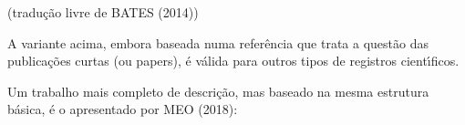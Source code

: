 \documentclass[
12pt,		%
openright,	%
twoside,  %
a4paper,			%
chapter=TITLE,		%
english,			%
french,				%
spanish,			%
brazil				%
]{USPSC-classe/USPSC_RedarTex}
\begin{document}
\begin{flushright}
\setlength{\absparsep}{0pt}
\tiny \begin{flushright}
\setlength{\absparsep}{0pt}
\tiny \begin{flushright}
\setlength{\absparsep}{0pt}
\tiny \begin{flushright}
\setlength{\absparsep}{0pt}
\tiny \begin{flushright}
\setlength{\absparsep}{0pt}
\tiny \begin{flushright}
\setlength{\absparsep}{0pt}
\tiny \begin{flushright}
\setlength{\absparsep}{0pt}
\tiny \begin{flushright}
\setlength{\absparsep}{0pt}
\tiny (tradu\c{c}\~ao livre de BATES (2014)) \normalsize 
\end{flushright}

 \normalsize 
\end{flushright}

 \normalsize 
\end{flushright}

 \normalsize 
\end{flushright}

 \normalsize 
\end{flushright}

 \normalsize 
\end{flushright}

 \normalsize 
\end{flushright}

 \normalsize 
\end{flushright}


A variante acima, embora baseada numa refer\^encia que trata a quest\~ao das publica\c{c}\~oes curtas (ou \textquotedbl papers\textquotedbl ), \'e v\'alida para outros tipos de registros cient\'{\i}ficos.








Um trabalho mais completo de descri\c{c}\~ao, mas baseado na mesma estrutura b\'asica, \'e o apresentado por MEO (2018):
\end{document}
